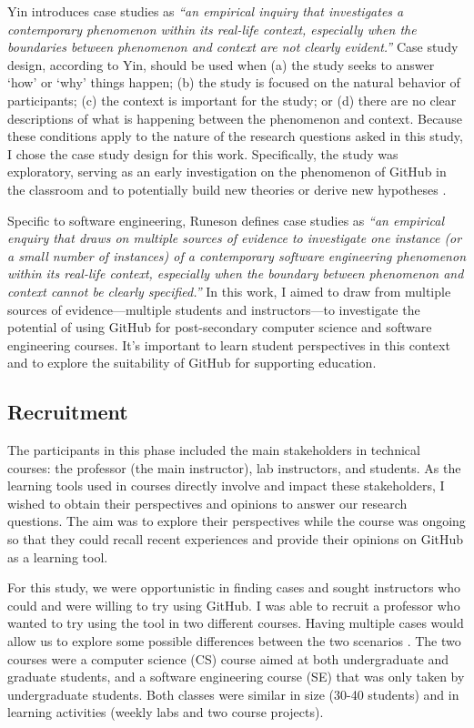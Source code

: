 Yin \cite{yin2013case} introduces case studies as \textit{``an empirical inquiry that investigates a contemporary phenomenon within its real-life context, especially when the boundaries between phenomenon and context are not clearly evident.''} Case study design, according to Yin, should be used when (a) the study seeks to answer `how' or `why' things happen; (b) the study is focused on the natural behavior of participants; (c) the context is important for the study; or (d) there are no clear descriptions of what is happening between the phenomenon and context. Because these conditions apply to the nature of the research questions asked in this study, I chose the case study design for this work. Specifically, the study was exploratory, serving as an early investigation on the phenomenon of GitHub in the classroom and to potentially build new theories or derive new hypotheses \cite{easterbrook2008selecting}.

Specific to software engineering, Runeson \cite{runeson2012case} defines case studies as \textit{``an empirical enquiry that draws on multiple sources of evidence to investigate one instance (or a small number of instances) of a contemporary software engineering phenomenon within its real-life context, especially when the boundary between phenomenon and context cannot be clearly specified.''} In this work, I aimed to draw from multiple sources of evidence---multiple students and instructors---to investigate the potential of using GitHub for post-secondary computer science and software engineering courses. It's important to learn student perspectives in this context and to explore the suitability of GitHub for supporting education.

\subsection{Recruitment}
The participants in this phase included the main stakeholders in technical courses: the professor (the main instructor), lab instructors, and students. As the learning tools used in courses directly involve and impact these stakeholders, I wished to obtain their perspectives and opinions to answer our research questions. The aim was to explore their perspectives while the course was ongoing so that they could recall recent experiences and provide their opinions on GitHub as a learning tool.

For this study, we were opportunistic in finding cases and sought instructors who could and were willing to try using GitHub. I was able to recruit a professor who wanted to try using the tool in two different courses. Having multiple cases would allow us to explore some possible differences between the two scenarios \cite{yin2013case}. The two courses were a computer science (CS) course aimed at both undergraduate and graduate students, and a software engineering course (SE) that was only taken by undergraduate students. Both classes were similar in size (30-40 students) and in learning activities (weekly labs and two course projects).

